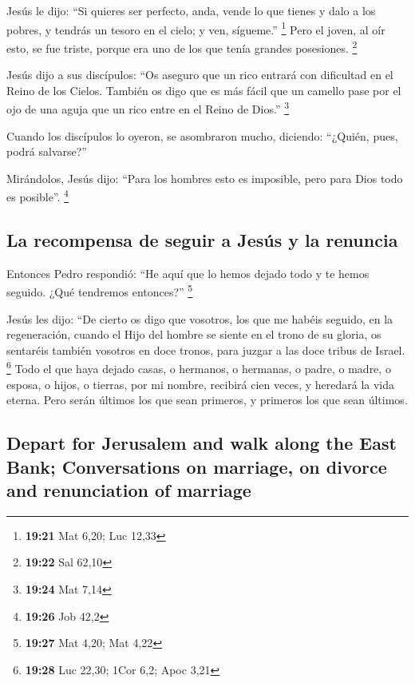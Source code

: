 \begin{paracol}{2}
 Jesús le dijo: ``Si quieres ser perfecto, anda, vende lo
que tienes y dalo a los pobres, y tendrás un tesoro en el cielo; y ven,
sígueme.'' \footnote{\textbf{19:21} Mat 6,20; Luc 12,33} 
Pero el joven, al oír esto, se fue triste, porque era uno de los que
tenía grandes posesiones. \footnote{\textbf{19:22} Sal 62,10}

 Jesús dijo a sus discípulos: ``Os aseguro que un rico
entrará con dificultad en el Reino de los Cielos. 
También os digo que es más fácil que un camello pase por el ojo de una
aguja que un rico entre en el Reino de Dios.'' \footnote{\textbf{19:24}
  Mat 7,14}

 Cuando los discípulos lo oyeron, se asombraron mucho,
diciendo: ``¿Quién, pues, podrá salvarse?''

 Mirándolos, Jesús dijo: ``Para los hombres esto es
imposible, pero para Dios todo es posible''. \footnote{\textbf{19:26}
  Job 42,2}

\hypertarget{la-recompensa-de-seguir-a-jesuxfas-y-la-renuncia}{%
\subsection{La recompensa de seguir a Jesús y la
renuncia}\label{la-recompensa-de-seguir-a-jesuxfas-y-la-renuncia}}

 Entonces Pedro respondió: ``He aquí que lo hemos dejado
todo y te hemos seguido. ¿Qué tendremos entonces?'' \footnote{\textbf{19:27}
  Mat 4,20; Mat 4,22}

 Jesús les dijo: ``De cierto os digo que vosotros, los
que me habéis seguido, en la regeneración, cuando el Hijo del hombre se
siente en el trono de su gloria, os sentaréis también vosotros en doce
tronos, para juzgar a las doce tribus de Israel. \footnote{\textbf{19:28}
  Luc 22,30; 1Cor 6,2; Apoc 3,21}  Todo el que haya
dejado casas, o hermanos, o hermanas, o padre, o madre, o esposa, o
hijos, o tierras, por mi nombre, recibirá cien veces, y heredará la vida
eterna.  Pero serán últimos los que sean primeros, y
primeros los que sean últimos.

\switchcolumn
\begin{otherlanguage}{english}

\hypertarget{depart-for-jerusalem-and-walk-along-the-east-bank-conversations-on-marriage-on-divorce-and-renunciation-of-marriage}{%
\subsection{Depart for Jerusalem and walk along the East Bank;
Conversations on marriage, on divorce and renunciation of
marriage}\label{depart-for-jerusalem-and-walk-along-the-east-bank-conversations-on-marriage-on-divorce-and-renunciation-of-marriage}}


\end{otherlanguage}
\end{paracol}
